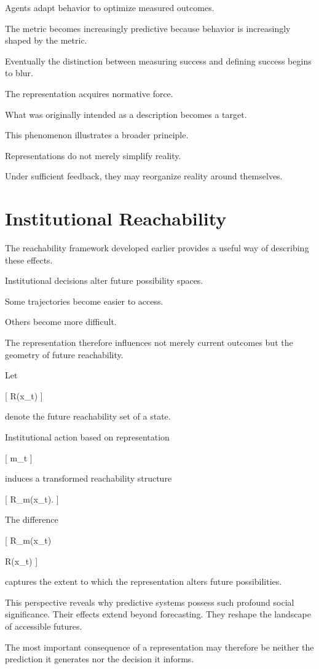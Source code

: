 \documentclass[11pt,oneside,openany]{book}
\begin{document}
Agents adapt behavior to optimize measured outcomes.

The metric becomes increasingly predictive because behavior is increasingly shaped by the metric.

Eventually the distinction between measuring success and defining success begins to blur.

The representation acquires normative force.

What was originally intended as a description becomes a target.

This phenomenon illustrates a broader principle.

Representations do not merely simplify reality.

Under sufficient feedback, they may reorganize reality around themselves.

\section{Institutional Reachability}

The reachability framework developed earlier provides a useful way of describing these effects.

Institutional decisions alter future possibility spaces.

Some trajectories become easier to access.

Others become more difficult.

The representation therefore influences not merely current outcomes but the geometry of future reachability.

Let

[
R(x_t)
]

denote the future reachability set of a state.

Institutional action based on representation

[
m_t
]

induces a transformed reachability structure

[
R_{m}(x_t).
]

The difference

[
R_m(x_t)

R(x_t)
]

captures the extent to which the representation alters future possibilities.

This perspective reveals why predictive systems possess such profound social significance. Their effects extend beyond forecasting. They reshape the landscape of accessible futures.

The most important consequence of a representation may therefore be neither the prediction it generates nor the decision it informs.
\end{document}
